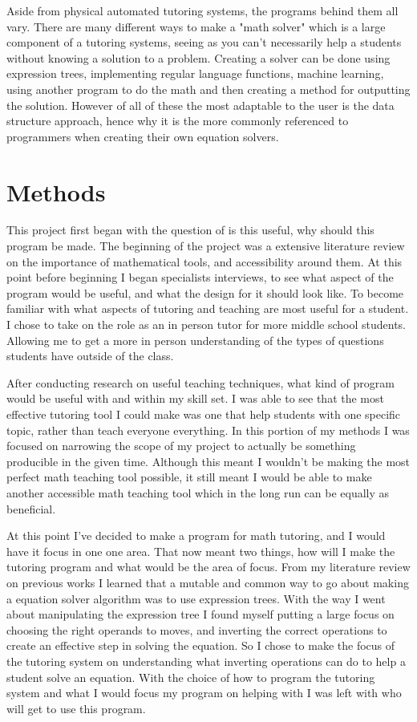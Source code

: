 \documentclass[10pt,twocolumn]{article}
\begin{document}
Aside from physical automated tutoring systems, the programs behind them all vary. There are many different ways to make a "math solver" which is a large component of a tutoring systems, seeing as you can't necessarily help a students without knowing a solution to a problem. Creating a solver can be done using expression trees, implementing regular language functions, machine learning, using another program to do the math and then creating a method for outputting the solution. However of all of these the most adaptable to the user is the data structure approach, hence why it is the more commonly referenced to programmers when creating their own equation solvers. 

\section{Methods}
This project first began with the question of is this useful, why should this program be made. The beginning of the project was a extensive literature review on the importance of mathematical tools, and accessibility around them. At this point before beginning I began specialists interviews, to see what aspect of the program would be useful, and what the design for it should look like. To become familiar with what aspects of tutoring and teaching are most useful for a student. I chose to take on the role as an in person tutor for more middle school students. Allowing me to get a more in person understanding of the types of questions students have outside of the class. 

After conducting research on useful teaching techniques, what kind of program would be useful with and within my skill set. I was able to see that the most effective tutoring tool I could make was one that help students with one specific topic, rather than teach everyone everything. In this portion of my methods I was focused on narrowing the scope of my project to actually be something producible in the given time. Although this meant I wouldn't be making the most perfect math teaching tool possible, it still meant I would be able to make another accessible math teaching tool which in the long run can be equally as beneficial.

At this point I've decided to make a program for math tutoring, and I would have it focus in one one area. That now meant two things, how will I make the tutoring program and what would be the area of focus. From my literature review on previous works I learned that a mutable and common way to go about making a equation solver algorithm was to use expression trees. With the way I went about manipulating the expression tree I found myself putting a large focus on choosing the right operands to moves, and inverting the correct operations to create an effective step in solving the equation. So I chose to make the focus of the tutoring system on understanding what inverting operations can do to help a student solve an equation. With the choice of how to program the tutoring system and what I would focus my program on helping with I was left with who will get to use this program.
\end{document}
